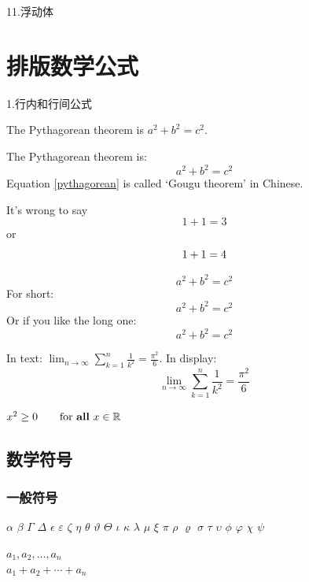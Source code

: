 \documentclass[12pt,UTF8]{ctexart}%
\begin{document}
11.浮动体\par



\section{排版数学公式}

1.行内和行间公式

The Pythagorean theorem is
$a^2 + b^2 = c^2$.


The Pythagorean theorem is:
\begin{equation}
a^2 + b^2 = c^2 \label{pythagorean}
\end{equation}
Equation \eqref{pythagorean} is
called `Gougu theorem' in Chinese.



It's wrong to say
\begin{equation}
1 + 1 = 3 \tag{dumb}
\end{equation}
or
\begin{equation}
1 + 1 = 4 \notag
\end{equation}


\begin{equation*}
a^2 + b^2 = c^2
\end{equation*}
For short:
\[ a^2 + b^2 = c^2 \]
Or if you like the long one:
\begin{displaymath}
a^2 + b^2 = c^2
\end{displaymath}


In text:
$\lim_{n \to \infty}
\sum_{k=1}^n \frac{1}{k^2}
= \frac{\pi^2}{6}$.
In display:
\[
\lim_{n \to \infty}
\sum_{k=1}^n \frac{1}{k^2}
= \frac{\pi^2}{6}
\]


$x^{2} \geq 0 \qquad
\text{for \textbf{all} }
x\in\mathbb{R}$


\subsection{数学符号}

\subsubsection{一般符号}

$\alpha$ $\beta$ $\Gamma$ $\Delta$
$\epsilon$ $\varepsilon$ $\zeta$ $\eta$ $\theta$ $\vartheta$ $\Theta$
$\iota$ $\kappa$ $\lambda$ $\mu$
$\xi$ $\pi$ $\rho$ $\varrho$
$\sigma$ $\tau$ $\upsilon$ $\phi$ $\varphi$
$\chi$ $\psi$


$a_1, a_2, \dots, a_n$ \\
$a_1 + a_2 + \cdots + a_n$ \par
\end{document}
